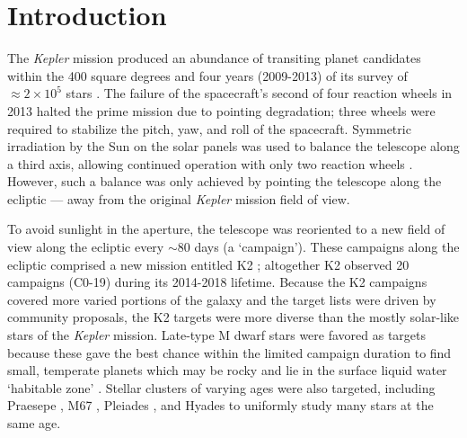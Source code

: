 \documentclass[twocolumn]{aastex62}
\newcommand{\project}[1]{\textsl{#1}}
\begin{document}


\section{Introduction}

The \project{Kepler} mission \citep{bor10} produced an abundance of
transiting planet candidates within the 400 square degrees and four
years (2009-2013) of its survey of $\approx 2 \times 10^5$ stars
\citep{bor16, cou16, tho18}.  The failure of the spacecraft's second
of four reaction wheels in 2013 halted the prime mission due to
pointing degradation; three wheels were required to stabilize the
pitch, yaw, and roll of the spacecraft.  Symmetric irradiation by the
Sun on the solar panels was used to balance the telescope along a
third axis, allowing continued operation with only two reaction wheels
\citep{how14}.  However, such a balance was only achieved by pointing
the telescope along the ecliptic --- away from the original
\project{Kepler} mission field of view.

To avoid sunlight in the aperture, the telescope was reoriented to a
new field of view along the ecliptic every $ \sim$80 days (a
`campaign'). These campaigns along the ecliptic comprised a new
mission entitled K2 \citep{how14}; altogether K2 observed 20 campaigns
(C0-19) during its 2014-2018 lifetime. Because the K2 campaigns
covered more varied portions of the galaxy and the target lists were
driven by community proposals, the K2 targets were more diverse than
the mostly solar-like stars of the \project{Kepler} mission. Late-type
M dwarf stars were favored as targets because these gave the best
chance within the limited campaign duration to find small, temperate
planets which may be rocky and lie in the surface liquid water
`habitable zone' \citep{kas93, kop13}.  Stellar clusters of varying
ages were also targeted, including Praesepe \citep[also called
  Beehive;][]{man17, lib16, obe16}, M67 \citep{nar16}, Pleiades
\citep{dav16a}, and Hyades \citep{man16} to uniformly study many stars
at the same age.
\end{document}
